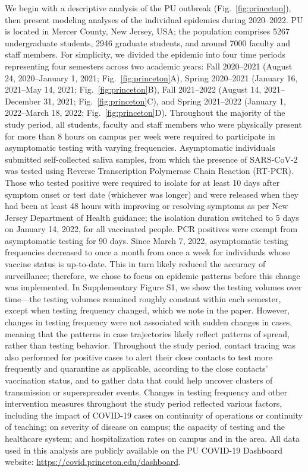 \documentclass[12pt]{article}
\newcommand{\fref}[1]{Fig.~\ref{fig:#1}}
\begin{document}
We begin with a descriptive analysis of the PU outbreak (\fref{princeton}), then present modeling analyses of the individual epidemics during 2020--2022.
PU is located in Mercer County, New Jersey, USA;
the population comprises 5267 undergraduate students, 2946 graduate students, and around 7000 faculty and staff members.
For simplicity, we divided the epidemic into four time periods representing four semesters across two academic years: Fall 2020--2021 (August 24, 2020--January 1, 2021; \fref{princeton}A), Spring 2020--2021 (January 16, 2021--May 14, 2021; \fref{princeton}B), Fall 2021--2022 (August 14, 2021--December 31, 2021; \fref{princeton}C), and Spring 2021--2022 (January 1, 2022--March 18, 2022; \fref{princeton}D).
Throughout the majority of the study period, all students, faculty and staff members who were physically present for more than 8 hours on campus per week were required to participate in asymptomatic testing with varying frequencies.
Asymptomatic individuals submitted self-collected saliva samples, from which the presence of SARS-CoV-2 was tested using Reverse Transcription Polymerase Chain Reaction (RT-PCR).  
Those who tested positive were required to isolate for at least 10 days after symptom onset or test date (whichever was longer) and were released when they had been at least 48 hours with improving or resolving symptoms as per New Jersey Department of Health guidance;
the isolation duration switched to 5 days on January 14, 2022, for all vaccinated people.
PCR positives were exempt from asymptomatic testing for 90 days.
Since March 7, 2022, asymptomatic testing frequencies decreased to once a month from once a week for individuals whose vaccine status is up-to-date. This in turn likely reduced the accuracy of surveillance; therefore, we chose to focus on epidemic patterns before this change was implemented.
In Supplementary Figure S1, we show the testing volumes over time---the testing volumes remained roughly constant within each semester, except when testing frequency changed, which we note in the paper.
However, changes in testing frequency were not associated with sudden changes in cases, meaning that the patterns in case trajectories likely reflect patterns of spread, rather than testing behavior.
Throughout the study period, contact tracing was also performed for positive cases to alert their close contacts to test more frequently and quarantine as applicable, according to the close contacts’ vaccination status, and to gather data that could help uncover clusters of transmission or superspreader events.
Changes in testing frequency and other intervention measures throughout the study period reflected various factors, including the impact of COVID-19 cases on continuity of operations or continuity of teaching; on severity of disease on campus; the capacity of testing and the healthcare system; and hospitalization rates on campus and in the area.
All data used in this analysis are publicly available on the PU COVID-19 Dashboard website: \url{https://covid.princeton.edu/dashboard}.
\end{document}
